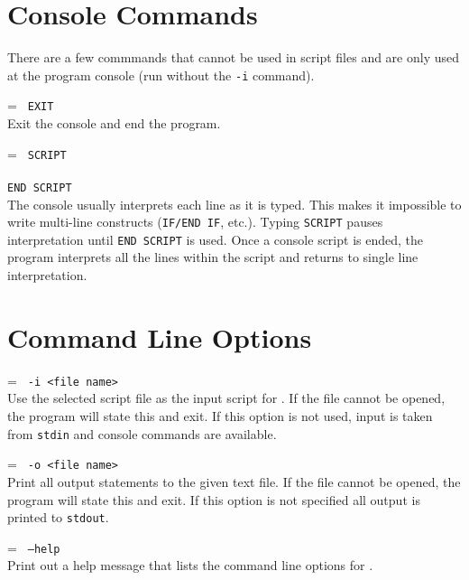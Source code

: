 \section{Console Commands}
\label{consoleCommands}
There are a few commmands that cannot be used in script files and are only used
at the program console (\progLogo run without the \texttt{-i} command).

\noindent\hangindent=\parindent
\texttt{%
EXIT
}\\
Exit the \progLogo console and end the program.

\breakline

\noindent\hangindent=\parindent
\texttt{%
SCRIPT\\
\\
END SCRIPT
}\\
The console usually interprets each line as it is typed. This makes it
impossible to write multi-line constructs (\texttt{IF/END~IF}, etc.). Typing
\texttt{SCRIPT} pauses interpretation until \texttt{END~SCRIPT} is used. Once
a console script is ended, the program interprets all the lines within the
script and returns to single line interpretation.

\section{Command Line Options}
\label{commandLineOptions}

\noindent\hangindent=\parindent
\texttt{%
-i <file name>
}\\
Use the selected script file as the input script for \progLogo. If the file
cannot be opened, the program will state this and exit. If this option is
not used, input is taken from \texttt{stdin} and console commands are
available.

\breakline

\noindent\hangindent=\parindent
\texttt{%
-o <file name>
}\\
Print all output statements to the given text file. If the file cannot be
opened, the program will state this and exit. If this option is not specified
all output is printed to \texttt{stdout}.

\breakline

\noindent\hangindent=\parindent
\texttt{%
--help
}\\
Print out a help message that lists the command line options for \progLogo.

